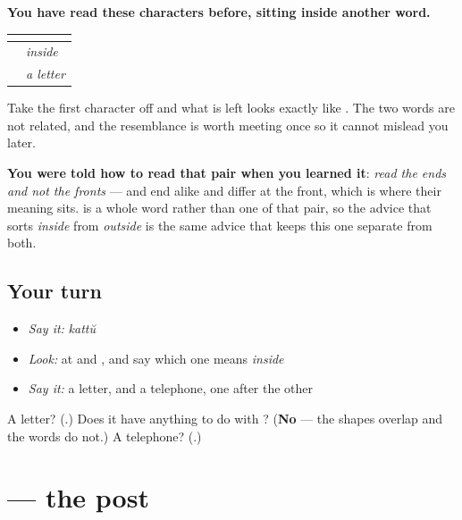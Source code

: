 \begin{grammarlens}[title={Grammar Lens: a shape that hides inside a word you know}]
\textbf{You have read these characters before, sitting inside another word.}

\noindent
\begin{tabularx}{\linewidth}{@{}>{\raggedright\arraybackslash}X>{\raggedright\arraybackslash}X@{}}
\toprule
\textbf{} & \textbf{} \\
\midrule
\textbf{\ml{അകത്ത്}} & \emph{inside} \\
\textbf{\ml{കത്ത്}} & \emph{a letter} \\
\bottomrule
\end{tabularx}

Take the first character off \textbf{} and what is left looks exactly like \textbf{}. The two words are not related, and the resemblance is worth meeting once so it cannot mislead you later.

\textbf{You were told how to read that pair when you learned it}: \emph{read the ends and not the fronts} — \textbf{} and \textbf{} end alike and differ at the front, which is where their meaning sits. \textbf{} is a whole word rather than one of that pair, so the advice that sorts \emph{inside} from \emph{outside} is the same advice that keeps this one separate from both.
\end{grammarlens}

\subsection*{Your turn}
\begin{itemize}
\raggedright
  \item \emph{Say it:} \emph{kattŭ}
  \item \emph{Look:} at \textbf{} and \textbf{}, and say which one means \emph{inside}
  \item \emph{Say it:} a letter, and a telephone, one after the other
\end{itemize}

\begin{tcolorbox}[breakable,colback=teal!4,colframe=teal!35!black,title={Before you move on}]
A letter? (\textbf{}.) Does it have anything to do with \textbf{}? (\textbf{No} — the shapes overlap and the words do not.) A telephone? (\textbf{}.)
\end{tcolorbox}
\section[\texorpdfstring{\ml{തപാൽ} (tapāl)}{തപാൽ (tapāl)}]{ — the post}

